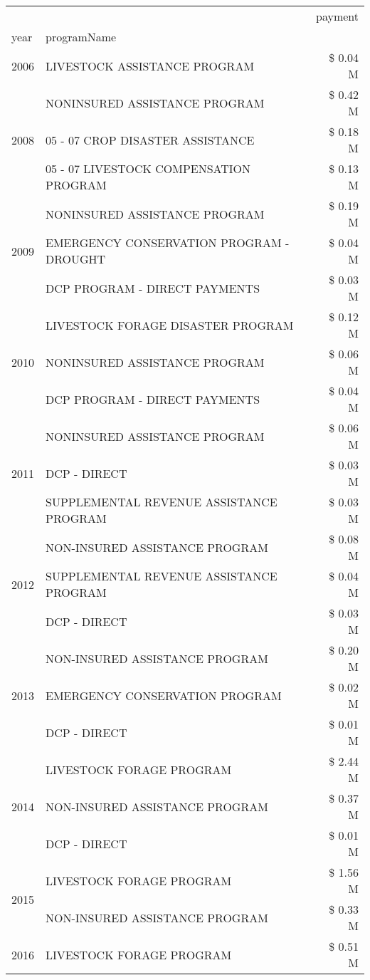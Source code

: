 \begin{tabular}{llr}
\toprule
 &  & payment \\
year & programName &  \\
\midrule
2006 & LIVESTOCK ASSISTANCE PROGRAM & \$ 0.04 M \\
\cline{1-3}
\multirow[t]{3}{*}{2008} & NONINSURED ASSISTANCE PROGRAM & \$ 0.42 M \\
 & 05 - 07 CROP DISASTER ASSISTANCE & \$ 0.18 M \\
 & 05 - 07 LIVESTOCK COMPENSATION PROGRAM & \$ 0.13 M \\
\cline{1-3}
\multirow[t]{3}{*}{2009} & NONINSURED ASSISTANCE PROGRAM & \$ 0.19 M \\
 & EMERGENCY CONSERVATION PROGRAM - DROUGHT & \$ 0.04 M \\
 & DCP PROGRAM - DIRECT PAYMENTS & \$ 0.03 M \\
\cline{1-3}
\multirow[t]{3}{*}{2010} & LIVESTOCK FORAGE DISASTER  PROGRAM & \$ 0.12 M \\
 & NONINSURED ASSISTANCE PROGRAM & \$ 0.06 M \\
 & DCP PROGRAM - DIRECT PAYMENTS & \$ 0.04 M \\
\cline{1-3}
\multirow[t]{3}{*}{2011} & NONINSURED ASSISTANCE PROGRAM & \$ 0.06 M \\
 & DCP - DIRECT & \$ 0.03 M \\
 & SUPPLEMENTAL REVENUE ASSISTANCE PROGRAM & \$ 0.03 M \\
\cline{1-3}
\multirow[t]{3}{*}{2012} & NON-INSURED ASSISTANCE PROGRAM & \$ 0.08 M \\
 & SUPPLEMENTAL REVENUE ASSISTANCE PROGRAM & \$ 0.04 M \\
 & DCP - DIRECT & \$ 0.03 M \\
\cline{1-3}
\multirow[t]{3}{*}{2013} & NON-INSURED ASSISTANCE PROGRAM & \$ 0.20 M \\
 & EMERGENCY CONSERVATION PROGRAM & \$ 0.02 M \\
 & DCP - DIRECT & \$ 0.01 M \\
\cline{1-3}
\multirow[t]{3}{*}{2014} & LIVESTOCK FORAGE PROGRAM & \$ 2.44 M \\
 & NON-INSURED ASSISTANCE PROGRAM & \$ 0.37 M \\
 & DCP - DIRECT & \$ 0.01 M \\
\cline{1-3}
\multirow[t]{2}{*}{2015} & LIVESTOCK FORAGE PROGRAM & \$ 1.56 M \\
 & NON-INSURED ASSISTANCE PROGRAM & \$ 0.33 M \\
\cline{1-3}
\multirow[t]{3}{*}{2016} & LIVESTOCK FORAGE PROGRAM & \$ 0.51 M \\

\end{tabular}
